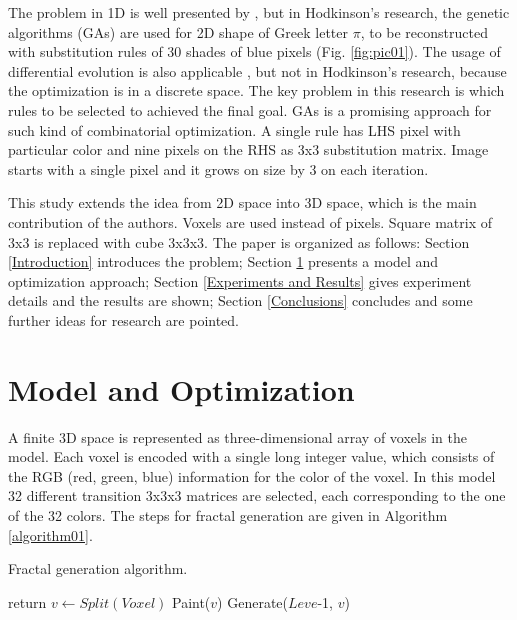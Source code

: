 \documentclass{llncs}
\begin{document}
The problem in 1D is well presented by \cite{shonkwiler01}, but in Hodkinson's research, the genetic algorithms (GAs) are used for 2D shape of Greek letter $\pi$, to be reconstructed with substitution rules of 30 shades of blue pixels (Fig. \ref{fig:pic01}). The usage of differential evolution is also applicable \cite{zelinka01}, but not in Hodkinson's research, because the optimization is in a discrete space.  The key problem in this research is which rules to be selected to achieved the final goal. GAs is a promising approach for such kind of combinatorial optimization. A single rule has LHS pixel with particular color and nine pixels on the RHS as 3x3 substitution matrix. Image starts with a single pixel and it grows on size by 3 on each iteration. 

This study extends the idea from 2D space into 3D space, which is the main contribution of the authors. Voxels are used instead of pixels. Square matrix of 3x3 is replaced with cube 3x3x3. The paper is organized as follows: Section \ref{Introduction} introduces the problem; Section \ref{Model and Optimization} presents a model and optimization approach; Section \ref{Experiments and Results} gives experiment details and the results are shown; Section \ref{Conclusions} concludes and some further ideas for research are pointed.

\section{Model and Optimization} \label{Model and Optimization}

A finite 3D space is represented as three-dimensional array of voxels in the model. Each voxel is encoded with a single long integer value, which consists of the RGB (red, green, blue) information for the color of the voxel. In this model 32 different transition 3x3x3 matrices are selected, each corresponding to the one of the 32 colors. The steps for fractal generation are given in Algorithm \ref{algorithm01}.

\begin{algorithm}
\caption{Fractal generation algorithm.}\label{algorithm01}
\begin{algorithmic}[1]
  \State return\label{alg:step04}
\EndIf
\State $v\gets Split(Voxel)$\label{alg:step01}
  \State Paint($v$)\label{alg:step02}
  \State Generate($Leve$-1, $v$)\label{alg:step03}
\EndFor
\EndProcedure
\end{algorithmic}
\end{algorithm}
\FloatBarrier
\end{document}
